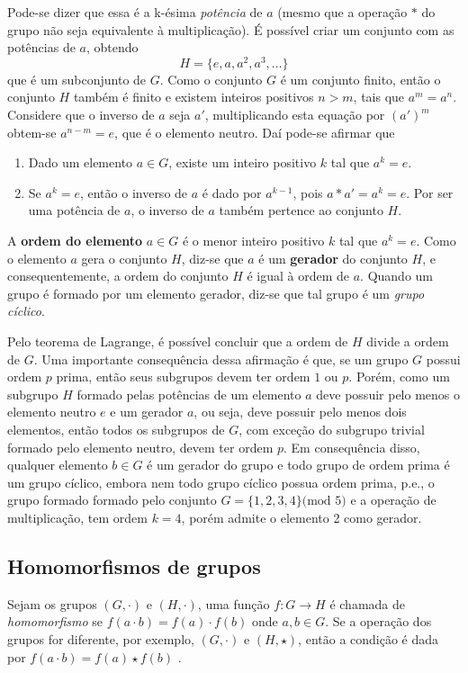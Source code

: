 Pode-se dizer que essa é a k-ésima \textit{potência} de $a$ (mesmo que a operação $*$ do grupo não seja equivalente à multiplicação). É possível criar um conjunto com as potências de $a$, obtendo
$$
H = \{e, a, a^2, a^3, \ldots\}
$$
que é um subconjunto de $G$. Como o conjunto $G$ é um conjunto finito, então o conjunto $H$ também é finito e existem inteiros positivos $n > m$, tais que $a^m = a^n$. Considere que o inverso de $a$ seja $a'$, multiplicando esta equação por $(a')^m$ obtem-se $a^{n-m} = e$, que é o elemento neutro.\cite{Coutinho:2014} Daí pode-se afirmar que
\begin{enumerate}
\item Dado um elemento $a \in G$, existe um inteiro positivo $k$ tal que $a^k = e$.
\item Se $a^k = e$, então o inverso de $a$ é dado por $a^{k-1}$, pois $a * a' = a^k = e$. Por ser uma potência de $a$, o inverso de $a$ também pertence ao conjunto $H$.
\end{enumerate}

A \textbf{ordem do elemento} $a \in G$ é o menor inteiro positivo $k$ tal que $a^k = e$. Como o elemento $a$ gera o conjunto $H$, diz-se que $a$ é um \textbf{gerador} do conjunto $H$, e consequentemente, a ordem do conjunto $H$ é igual à ordem de $a$. Quando um grupo é formado por um elemento gerador, diz-se que tal grupo é um \textit{grupo cíclico}. \cite{Coutinho:2014}

Pelo teorema de Lagrange, é possível concluir que a ordem de $H$ divide a ordem de $G$. Uma importante consequência dessa afirmação é que, se um grupo $G$ possui ordem $p$ prima, então seus subgrupos devem ter ordem $1$ ou $p$. Porém, como um subgrupo $H$ formado pelas potências de um elemento $a$ deve possuir pelo menos o elemento neutro $e$ e um gerador $a$, ou seja, deve possuir pelo menos dois elementos, então todos os subgrupos de $G$, com exceção do subgrupo trivial formado pelo elemento neutro, devem ter ordem $p$. Em consequência disso, qualquer elemento $b \in G$ é um gerador do grupo e todo grupo de ordem prima é um grupo cíclico, embora nem todo grupo cíclico possua ordem prima, p.e., o grupo formado formado pelo conjunto $G=\{1,2,3,4\} \mbox{(mod 5)}$ e a operação de multiplicação, tem ordem $k = 4$, porém admite o elemento 2 como gerador. \cite{Coutinho:2014}

%
%
\subsection{Homomorfismos de grupos}
Sejam os grupos $(G, \cdot)$ e $(H, \cdot)$, uma função $f: G \rightarrow H$ é chamada de \textit{homomorfismo} se $f(a \cdot b) = f(a) \cdot f(b)$ onde $a, b \in G$. Se a operação dos grupos for diferente, por exemplo, $(G, \cdot)$ e $(H, \star)$, então a condição é dada por $f(a \cdot b) = f(a) \star f(b)$ \cite{Gilbert:2004}.

